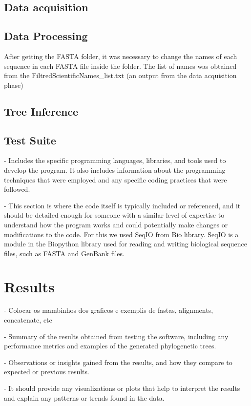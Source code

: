 \documentclass[12pt]{article}
\begin{document}
\subsection{Data acquisition}

\subsection{Data Processing}
After getting the FASTA folder, it was necessary to change the names of each sequence in each FASTA file inside the folder. The list of names was obtained from the FiltredScientificNames_list.txt (an output from the data acquisition phase)
\subsection{Tree Inference}

\subsection{Test Suite}

- Includes the specific programming languages, libraries, and tools used to develop the program. It also includes information about the programming techniques that were employed and any specific coding practices that were followed. 

- This section is where the code itself is typically included or referenced, and it should be detailed enough for someone with a similar level of expertise to understand how the program works and could potentially make changes or modifications to the code. For this we used SeqIO from Bio library. SeqIO is a module in the Biopython library used for reading and writing biological sequence files, such as FASTA and GenBank files.

\section{Results}\label{sec:desenvolvimentos}

- Colocar os mambinhos dos graficos e exemplis de fastas, alignments, concatenate, etc

- Summary of the results obtained from testing the software, including any performance metrics and examples of the generated phylogenetic trees. 

- Observations or insights gained from the results, and how they compare to expected or previous results. 

- It should provide any visualizations or plots that help to interpret the results and explain any patterns or trends found in the data.
\end{document}
